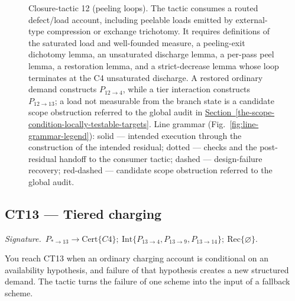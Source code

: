 \documentclass[
  11pt,
]{article}
\theoremstyle{definition}
\newcommand{\secref}[1]{\hyperref[#1]{Section~\ref*{#1}}}
\newcommand{\ctsignature}[1]{\par\noindent\emph{Signature.}\ #1\par\medskip}
\newcommand{\ctcert}[1]{\mathrm{Cert}\{#1\}}
\newcommand{\ctint}[1]{\mathrm{Int}\{#1\}}
\newcommand{\ctrec}[1]{\mathrm{Rec}\{#1\}}
\newcommand{\ctnone}{\varnothing}
\begin{document}
\begin{figure}[p]
{%
}
\caption[Closure-tactic 12: peeling loops]{Closure-tactic 12 (peeling loops).  The tactic consumes a routed defect/load account, including peelable loads emitted by external-type compression or exchange trichotomy.  It requires definitions of the saturated load and well-founded measure, a peeling-exit dichotomy lemma, an unsaturated discharge lemma, a per-pass peel lemma, a restoration lemma, and a strict-decrease lemma whose loop terminates at the C4 unsaturated discharge.  A restored ordinary demand constructs \(P_{12\to4}\), while a tier interaction constructs \(P_{12\to13}\); a load not measurable from the branch state is a candidate scope obstruction referred to the global audit in \secref{the-scope-condition-locally-testable-targets}.  Line grammar (Fig.~\ref{fig:line-grammar-legend}): solid --- intended execution through the construction of the intended residual; dotted --- checks and the post-residual handoff to the consumer tactic; dashed --- design-failure recovery; red-dashed --- candidate scope obstruction referred to the global audit.}
\label{fig:ct12-peeling-loop}
\end{figure}
\FloatBarrier

\subsection{CT13 --- Tiered charging}\label{ct:13}\label{tiered-charging-scheme-failure-as-a-demand}
\ctsignature{\(P_{\ast\to13}\to \ctcert{C4};\ \ctint{P_{13\to4},P_{13\to9},P_{13\to14}};\ \ctrec{\ctnone}\).}

You reach CT13 when an ordinary charging account is conditional on an
availability hypothesis, and failure of that hypothesis creates a new
structured demand.  The tactic turns the failure of one scheme into the
input of a fallback scheme.
\end{document}
